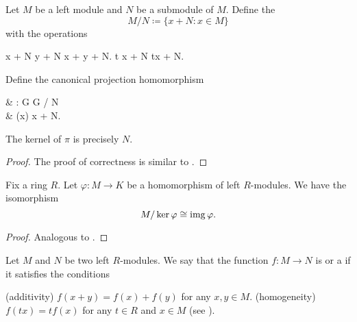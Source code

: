 \begin{definition}\label{def:quotient_left_module}
  Let \( M \) be a left module and \( N \) be a submodule of \( M \). Define the 
  \begin{equation*}
    M / N \coloneqq \{ x + N \colon x \in M \}
  \end{equation*}
  with the operations
  \begin{balign*}
    x + N \oplus y + N \coloneqq x + y + N.
    t \odot x + N \coloneqq tx + N.
  \end{balign*}

  Define the canonical projection homomorphism
  \begin{balign*}
     & \pi: G \to G / N        \\
     & \pi(x) \coloneqq x + N.
  \end{balign*}

  The kernel of \( \pi \) is precisely \( N \).
\end{definition}
\begin{proof}
  The proof of correctness is similar to .
\end{proof}

\begin{theorem}\label{thm:homomorphism_theorem_for_left_modules}
  Fix a ring \( R \). Let \( \varphi: M \to K \) be a homomorphism of left \( R \)-modules. We have the isomorphism
  \begin{equation*}
    M / \ker \varphi \cong \operatorname{img} \varphi.
  \end{equation*}
\end{theorem}
\begin{proof}
  Analogous to .
\end{proof}

\begin{definition}\label{def:linear_operator}
  Let \( M \) and \( N \) be two left \( R \)-modules. We say that the function \( f: M \to N \) is  or a  if it satisfies the conditions
  \begin{defenum}
    (additivity) \( f(x + y) = f(x) + f(y) \) for any \( x, y \in M \).
    (homogeneity) \( f(tx) = t f(x) \) for any \( t \in R \) and \( x \in M \) (see ).
  \end{defenum}
\end{definition}

